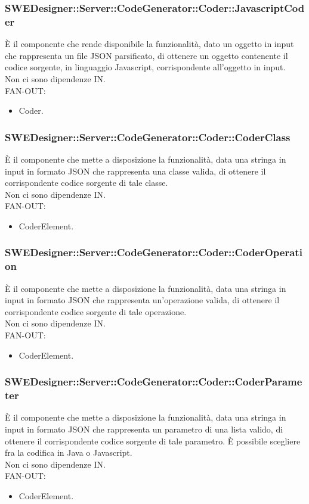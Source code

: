 \documentclass[../PianoDiQualifica.tex]{subfiles}
\begin{document}
		\subsubsection{SWEDesigner::Server::CodeGenerator::Coder::JavascriptCoder}
		È il componente che rende disponibile la funzionalità, dato un oggetto in input che rappresenta un file JSON parsificato, di ottenere un oggetto contenente il codice sorgente, in linguaggio Javascript, corrispondente all'oggetto in input.\\
		Non ci sono dipendenze IN.\\
		FAN-OUT:
		\begin{itemize}
			\item Coder.
		\end{itemize}
		\subsubsection{SWEDesigner::Server::CodeGenerator::Coder::CoderClass}
		È il componente che mette a disposizione la funzionalità, data una stringa in input in formato JSON che rappresenta una classe valida, di ottenere il corrispondente codice sorgente di tale classe.\\
		Non ci sono dipendenze IN.\\
	FAN-OUT:
	\begin{itemize}
		\item CoderElement.
	\end{itemize}
		\subsubsection{SWEDesigner::Server::CodeGenerator::Coder::CoderOperation}
		È il componente che mette a disposizione la funzionalità, data una stringa in input in formato JSON che rappresenta un'operazione valida, di ottenere il corrispondente codice sorgente di tale operazione.\\
		Non ci sono dipendenze IN.\\
		FAN-OUT:
		\begin{itemize}
			\item CoderElement.
		\end{itemize}
		\subsubsection{SWEDesigner::Server::CodeGenerator::Coder::CoderParameter}
		È il componente che mette a disposizione la funzionalità, data una stringa in input in formato JSON che rappresenta un parametro di una lista valido, di ottenere il corrispondente codice sorgente di tale parametro. È possibile scegliere fra la codifica in Java o Javascript.\\
		Non ci sono dipendenze IN.\\
		FAN-OUT:
		\begin{itemize}
			\item CoderElement.
		\end{itemize}
\end{document}
